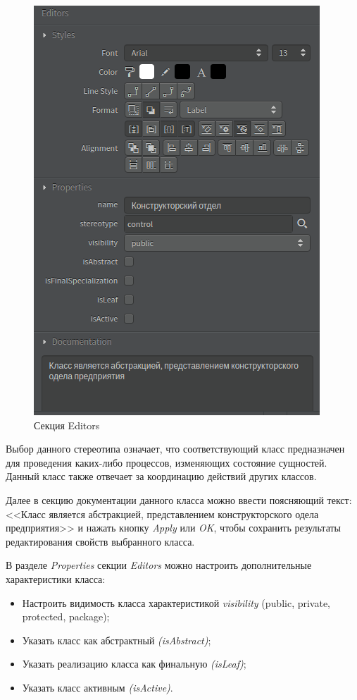 \documentclass[a4paper,12pt]{report}
\begin{document}
\begin{figure}[h!]
	\centering
	\includegraphics[width=0.5\linewidth]{images/classeditors}
	\caption{Секция Editors}
	\label{fig:classeditors}
\end{figure}



Выбор данного стереотипа означает, что соответствующий класс предназначен для проведения каких-либо процессов, изменяющих состояние сущностей. Данный класс также отвечает за координацию действий других классов.

Далее в секцию документации данного класса можно ввести поясняющий текст: <<Класс является абстракцией, представлением конструкторского одела предприятия>> и нажать кнопку \textit{Apply} или \textit{OK}, чтобы сохранить результаты редактирования свойств выбранного класса.



В разделе \textit{Properties} секции \textit{Editors} можно настроить дополнительные характеристики класса:
\begin{itemize}
	\item Настроить видимость класса характеристикой \textit{visibility} (public, private, protected, package);
	\item Указать класс как абстрактный \textit{(isAbstract)};
	\item Указать реализацию класса как финальную \textit{(isLeaf)};
	\item Указать класс активным \textit{(isActive)}.
\end{itemize}
\end{document}
